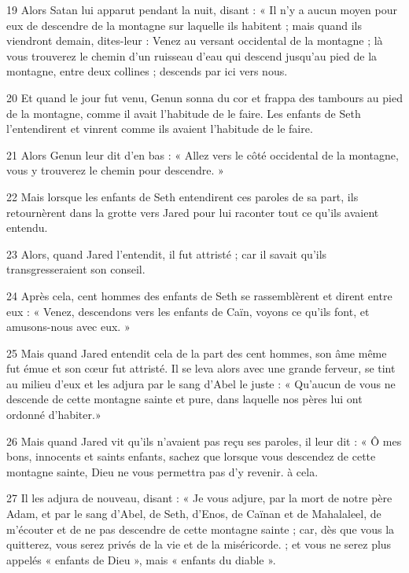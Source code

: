 \par 19 Alors Satan lui apparut pendant la nuit, disant : « Il n'y a aucun moyen pour eux de descendre de la montagne sur laquelle ils habitent ; mais quand ils viendront demain, dites-leur : Venez au versant occidental de la montagne ; là vous trouverez le chemin d'un ruisseau d'eau qui descend jusqu'au pied de la montagne, entre deux collines ; descends par ici vers nous.

\par 20 Et quand le jour fut venu, Genun sonna du cor et frappa des tambours au pied de la montagne, comme il avait l'habitude de le faire. Les enfants de Seth l'entendirent et vinrent comme ils avaient l'habitude de le faire.

\par 21 Alors Genun leur dit d'en bas : « Allez vers le côté occidental de la montagne, vous y trouverez le chemin pour descendre. »

\par 22 Mais lorsque les enfants de Seth entendirent ces paroles de sa part, ils retournèrent dans la grotte vers Jared pour lui raconter tout ce qu'ils avaient entendu.

\par 23 Alors, quand Jared l'entendit, il fut attristé ; car il savait qu'ils transgresseraient son conseil.

\par 24 Après cela, cent hommes des enfants de Seth se rassemblèrent et dirent entre eux : « Venez, descendons vers les enfants de Caïn, voyons ce qu'ils font, et amusons-nous avec eux. »

\par 25 Mais quand Jared entendit cela de la part des cent hommes, son âme même fut émue et son cœur fut attristé. Il se leva alors avec une grande ferveur, se tint au milieu d'eux et les adjura par le sang d'Abel le juste : « Qu'aucun de vous ne descende de cette montagne sainte et pure, dans laquelle nos pères lui ont ordonné d'habiter.»

\par 26 Mais quand Jared vit qu'ils n'avaient pas reçu ses paroles, il leur dit : « Ô mes bons, innocents et saints enfants, sachez que lorsque vous descendez de cette montagne sainte, Dieu ne vous permettra pas d'y revenir. à cela.

\par 27 Il les adjura de nouveau, disant : « Je vous adjure, par la mort de notre père Adam, et par le sang d'Abel, de Seth, d'Enos, de Caïnan et de Mahalaleel, de m'écouter et de ne pas descendre de cette montagne sainte ; car, dès que vous la quitterez, vous serez privés de la vie et de la miséricorde. ; et vous ne serez plus appelés « enfants de Dieu », mais « enfants du diable ».

